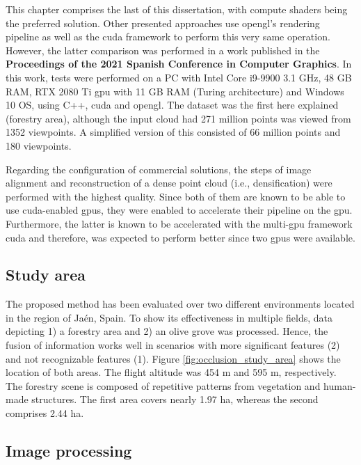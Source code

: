 \begin{kaobox}[frametitle=\acrshort{opengl} and \acrshort{cuda} comparison]
This chapter comprises the last of this dissertation, with compute shaders being the preferred solution. Other presented approaches use \acrshort{opengl}'s rendering pipeline as well as the \acrshort{cuda} framework to perform this very same operation. However, the latter comparison was performed in a work published in the \textbf{Proceedings of the 2021 Spanish Conference in Computer Graphics}. In this work, tests were performed on a PC with Intel Core i9-9900 3.1 GHz, 48 GB RAM, RTX 2080 Ti \acrshort{gpu} with 11 GB RAM (Turing architecture) and Windows 10 OS, using C++, \acrshort{cuda} and \acrshort{opengl}. The dataset was the first here explained (forestry area), although the input cloud had 271 million points was viewed from 1352 viewpoints. A simplified version of this consisted of 66 million points and 180 viewpoints. 
\end{kaobox}

Regarding the configuration of commercial solutions, the steps of image alignment and reconstruction of a dense point cloud (i.e., densification) were performed with the highest quality. Since both of them are known to be able to use \acrshort{cuda}-enabled \acrshort{gpu}s, they were enabled to accelerate their pipeline on the \acrshort{gpu}. Furthermore, the latter is known to be accelerated with the multi-\acrshort{gpu} framework \acrshort{cuda} and therefore, was expected to perform better since two \acrshort{gpu}s were available.  
\subsection{Study area}

The proposed method has been evaluated over two different environments located in the region of Jaén, Spain. To show its effectiveness in multiple fields, data depicting 1) a forestry area and 2) an olive grove was processed. Hence, the fusion of information works well in scenarios with more significant features (2) and not recognizable features (1). Figure \ref{fig:occlusion_study_area} shows the location of both areas. The flight altitude was 454 \si{\meter} and 595 \si{\meter}, respectively. The forestry scene is composed of repetitive patterns from vegetation and human-made structures. The first area covers nearly 1.97 \si{\hectare}, whereas the second comprises 2.44 \si{\hectare}.

\subsection{Image processing}

